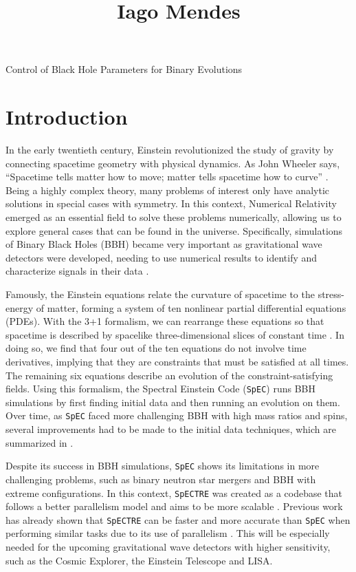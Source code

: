 \documentclass{../document}
\begin{document}
	\title
		[Caltech SURF First Interim Report]
		{Iago Mendes}
		{Control of Black Hole Parameters for Binary Evolutions}

	\section{Introduction}

  In the early twentieth century, Einstein revolutionized the study of gravity by connecting spacetime geometry with physical dynamics. As John Wheeler says, ``Spacetime tells matter how to move; matter tells spacetime how to curve'' \cite{Wheeler}. Being a highly complex theory, many problems of interest only have analytic solutions in special cases with symmetry. In this context, Numerical Relativity emerged as an essential field to solve these problems numerically, allowing us to explore general cases that can be found in the universe. Specifically, simulations of Binary Black Holes (BBH) became very important as gravitational wave detectors were developed, needing to use numerical results to identify and characterize signals in their data \cite{LIGO}.

	Famously, the Einstein equations relate the curvature of spacetime to the stress-energy of matter, forming a system of ten nonlinear partial differential equations (PDEs). With the 3+1 formalism, we can rearrange these equations so that spacetime is described by spacelike three-dimensional slices of constant time \cite{Alcubierre}. In doing so, we find that four out of the ten equations do not involve time derivatives, implying that they are constraints that must be satisfied at all times. The remaining six equations describe an evolution of the constraint-satisfying fields. Using this formalism, the Spectral Einstein Code ({\tt SpEC}) \cite{SpEC} runs BBH simulations by first finding initial data and then running an evolution on them. Over time, as {\tt SpEC} faced more challenging BBH with high mass ratios and spins, several improvements had to be made to the initial data techniques, which are summarized in \cite{Serguei}.
	
	Despite its success in BBH simulations, {\tt SpEC} shows its limitations in more challenging problems, such as binary neutron star mergers and BBH with extreme configurations. In this context, {\tt SpECTRE} \cite{SpECTRE} was created as a codebase that follows a better parallelism model and aims to be more scalable \cite{Kidder}. Previous work has already shown that {\tt SpECTRE} can be faster and more accurate than {\tt SpEC} when performing similar tasks due to its use of parallelism \cite{Vu}. This will be especially needed for the upcoming gravitational wave detectors with higher sensitivity, such as the Cosmic Explorer, the Einstein Telescope and LISA.
	
\end{document}
